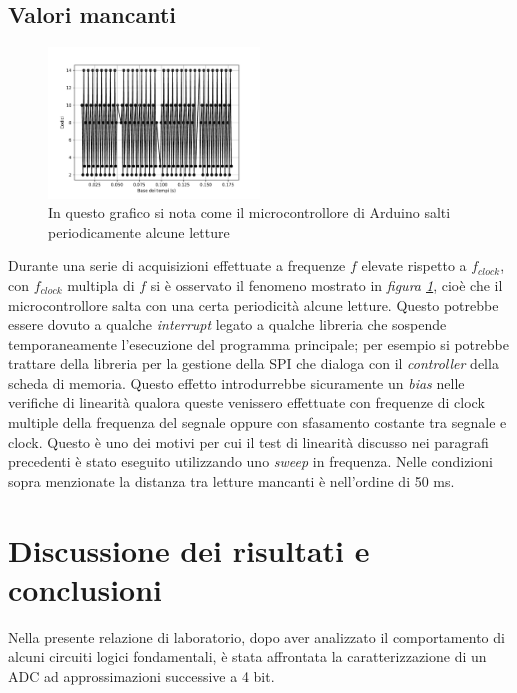 \documentclass[journal]{IEEEtran}
\begin{document}

\subsection{Valori mancanti}

\begin{figure}[H]%
\begin{center}
\includegraphics[width=0.50\textwidth]{analysis/output/letture_mancanti.pdf}
\caption{In questo grafico si nota come il microcontrollore di Arduino salti periodicamente alcune letture}
\label{fig:missing}
\end{center}
\end{figure}

Durante una serie di acquisizioni effettuate a frequenze $f$ elevate rispetto a $f_{clock}$, con $f_{clock}$ multipla di $f$ si è osservato il fenomeno mostrato in \textit{figura \ref{fig:missing}}, cioè che il microcontrollore salta con una certa periodicità alcune letture. Questo potrebbe essere dovuto a qualche \textit{interrupt} legato a qualche libreria che sospende temporaneamente l'esecuzione del programma principale; per esempio si potrebbe trattare della libreria per la gestione della SPI che dialoga con il \textit{controller} della scheda di memoria. Questo effetto introdurrebbe sicuramente un \textit{bias} nelle verifiche di linearità qualora queste venissero effettuate con frequenze di clock multiple della frequenza del segnale oppure con sfasamento costante tra segnale e clock. Questo è uno dei motivi per cui il test di linearità discusso nei paragrafi precedenti è stato eseguito utilizzando uno \textit{sweep} in frequenza. Nelle condizioni sopra menzionate la distanza tra letture mancanti è nell'ordine di 50 ms. 



\section{Discussione dei risultati e conclusioni}
Nella presente relazione di laboratorio, dopo aver analizzato il comportamento di alcuni circuiti logici fondamentali, è stata affrontata la caratterizzazione di un ADC ad approssimazioni successive a 4 bit. 
\\
\end{document}
